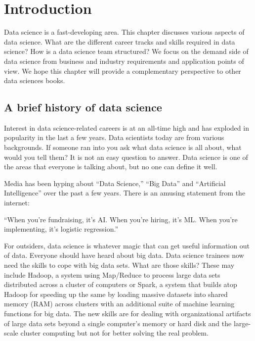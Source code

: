 \documentclass[
  12pt,
]{krantz}
\renewenvironment{quote}{\begin{VF}}{\end{VF}}
\begin{document}
\mainmatter

\hypertarget{introduction}{%
\chapter{Introduction}\label{introduction}}

Data science is a fast-developing area. This chapter discusses various aspects of data science. What are the different career tracks and skills required in data science? How is a data science team structured? We focus on the demand side of data science from business and industry requirements and application points of view. We hope this chapter will provide a complementary perspective to other data sciences books.

\hypertarget{a-brief-history-of-data-science}{%
\section{A brief history of data science}\label{a-brief-history-of-data-science}}

Interest in data science-related careers is at an all-time high and has exploded in popularity in the last a few years. Data scientists today are from various backgrounds. If someone ran into you ask what data science is all about, what would you tell them? It is not an easy question to answer. Data science is one of the areas that everyone is talking about, but no one can define it well.

Media has been hyping about ``Data Science,'' ``Big Data'' and ``Artificial Intelligence'' over the past a few years. There is an amusing statement from the internet:

\begin{quote}
``When you're fundraising, it's AI. When you're hiring, it's ML. When you're implementing, it's logistic regression.''
\end{quote}

For outsiders, data science is whatever magic that can get useful information out of data. Everyone should have heard about big data. Data science trainees now need the skills to cope with big data sets. What are those skills? These may include Hadoop, a system using Map/Reduce to process large data sets distributed across a cluster of computers or Spark, a system that builds atop Hadoop for speeding up the same by loading massive datasets into shared memory (RAM) across clusters with an additional suite of machine learning functions for big data. The new skills are for dealing with organizational artifacts of large data sets beyond a single computer's memory or hard disk and the large-scale cluster computing but not for better solving the real problem.
\end{document}
